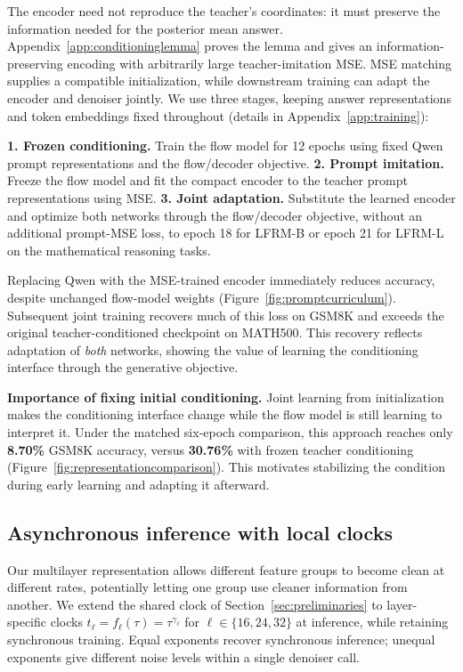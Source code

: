 \documentclass{article}
\begin{document}
The encoder need not reproduce the teacher's coordinates: it must preserve the information needed for the posterior mean answer. Appendix~\ref{app:conditioninglemma} proves the lemma and gives an information-preserving encoding with arbitrarily large teacher-imitation MSE. MSE matching supplies a compatible initialization, while downstream training can adapt the encoder and denoiser jointly. We use three stages, keeping answer representations and token embeddings fixed throughout (details in Appendix~\ref{app:training}):

\textbf{1. Frozen conditioning.} Train the flow model for 12 epochs using fixed Qwen prompt representations and the flow/decoder objective. \textbf{2. Prompt imitation.} Freeze the flow model and fit the compact encoder to the teacher prompt representations using MSE. \textbf{3. Joint adaptation.} Substitute the learned encoder and optimize both networks through the flow/decoder objective, without an additional prompt-MSE loss, to epoch 18 for LFRM-B or epoch 21 for LFRM-L on the mathematical reasoning tasks.

Replacing Qwen with the MSE-trained encoder immediately reduces accuracy, despite unchanged flow-model weights (Figure~\ref{fig:promptcurriculum}). Subsequent joint training recovers much of this loss on GSM8K and exceeds the original teacher-conditioned checkpoint on MATH500. This recovery reflects adaptation of \emph{both} networks, showing the value of learning the conditioning interface through the generative objective.

\textbf{Importance of fixing initial conditioning.}
\label{sec:conditioningcurriculum}
Joint learning from initialization makes the conditioning interface change while the flow model is still learning to interpret it. Under the matched six-epoch comparison, this approach reaches only \textbf{8.70\%} GSM8K accuracy, versus \textbf{30.76\%} with frozen teacher conditioning (Figure~\ref{fig:representationcomparison}). This motivates stabilizing the condition during early learning and adapting it afterward.

\subsection{Asynchronous inference with local clocks}
\label{sec:clocks}

Our multilayer representation allows different feature groups to become clean at different rates, potentially letting one group use cleaner information from another. We extend the shared clock of Section~\ref{sec:preliminaries} to layer-specific clocks $t_\ell=f_\ell(\tau)=\tau^{\gamma_\ell}$ for $\ell\in\{16,24,32\}$ at inference, while retaining synchronous training. Equal exponents recover synchronous inference; unequal exponents give different noise levels within a single denoiser call.
\end{document}
